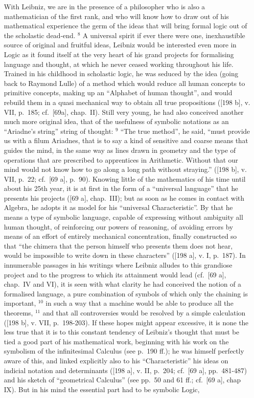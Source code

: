 With Leibniz, we are in the presence of a philosopher who is also a mathematician of the first rank, and who will know how to draw out of his mathematical experience the germ of the ideas that will bring formal logic out of the scholastic dead-end. \(^{8}\) A universal spirit if ever there were one, inexhaustible source of original and fruitful ideas, Leibniz would be interested even more in Logic as it found itself at the very heart of his grand projects for formalising language and thought, at which he never ceased working throughout his life. Trained in his childhood in scholastic logic, he was seduced by the idea (going back to Raymond Lulle) of a method which would reduce all human concepts to primitive concepts, making up an ``Alphabet of human thought'', and would rebuild them in a quasi mechanical way to obtain all true propositions ({[}198 b{]}, v. VII, p.~185; cf.~{[}69a{]}, chap.~II). Still very young, he had also conceived another much more original idea, that of the usefulness of symbolic notations as an ``Ariadne's string'' string of thought: \(^{9}\) ``The true method'', he said, ``must provide us with a filum Ariadnes, that is to say a kind of sensitive and coarse means that guides the mind, in the same way as lines drawn in geometry and the type of operations that are prescribed to apprentices in Arithmetic. Without that our mind would not know how to go along a long path without straying.'' ({[}198 b{]}, v. VII, p.~22; cf.~{[}69 a{]}, p.~90). Knowing little of the mathematics of his time until about his 25th year, it is at first in the form of a ``universal language'' that he presents his projects ({[}69 a{]}, chap.~III); but as soon as he comes in contact with Algebra, he adopts it as model for his ``universal Characteristic''. By that he means a type of symbolic language, capable of expressing without ambiguity all human thought, of reinforcing our powers of reasoning, of avoiding errors by means of an effort of entirely mechanical concentration, finally constructed so that ``the chimera that the person himself who presents them does not hear, would be impossible to write down in these characters'' ({[}198 a{]}, v. I, p.~187). In innumerable passages in his writings where Leibniz alludes to this grandiose project and to the progress to which its attainment would lead (cf.~{[}69 a{]}, chap.~IV and VI), it is seen with what clarity he had conceived the notion of a formalised language, a pure combination of symbols of which only the chaining is important, \(^{10}\) in such a way that a machine would be able to produce all the theorems, \(^{11}\) and that all controversies would be resolved by a simple calculation ({[}198 b{]}, v. VII, p.~198-203). If these hopes might appear excessive, it is none the less true that it is to this constant tendency of Leibniz's thought that must be tied a good part of his mathematical work, beginning with his work on the symbolism of the infinitesimal Calculus (see p.~190 ff.); he was himself perfectly aware of this, and linked explicitly also to his ``Characteristic'' his ideas on indicial notation and determinants ({[}198 a{]}, v. II, p.~204; cf.~{[}69 a{]}, pp.~481-487) and his sketch of ``geometrical Calculus'' (see pp.~50 and 61 ff.; cf.~{[}69 a{]}, chap IX). But in his mind the essential part had to be symbolic Logic, 